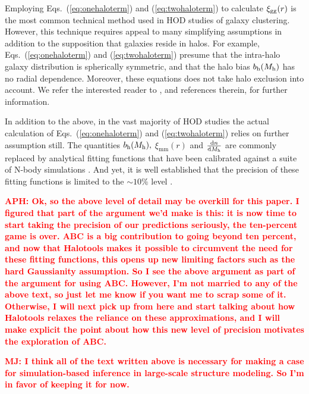 \documentclass[12pt, preprint]{aastex}
\newcommand{\todo}[1]{{\bf \textcolor{red}{ #1}}}
\begin{document}
Employing Eqs.~(\ref{eq:onehaloterm}) and (\ref{eq:twohaloterm}) to 
calculate $\xi_{\mathrm{gg}}(r)$ is the most common technical method used in HOD 
studies of galaxy clustering. 
However, this technique requires appeal to many simplifying assumptions 
in addition to the supposition that galaxies reside in halos. For example, 
Eqs.~(\ref{eq:onehaloterm}) and (\ref{eq:twohaloterm}) presume that 
the intra-halo galaxy distribution is spherically symmetric, and 
that the halo bias $b_{\mathrm{h}}(M_{\rm h})$ has no radial dependence. 
Moreover, these equations does not take halo exclusion into account. 
We refer the interested reader to \citet{cooray02,mo_vdb_white10,vdBosch13}, 
and references therein, for further information. 

In addition to the above, in the vast majority of HOD studies the actual calculation of 
Eqs.~(\ref{eq:onehaloterm}) and (\ref{eq:twohaloterm}) relies on further assumption still. 
The quantities $b_{\mathrm{h}}(M_{\rm h}),$ $\xi_{\mathrm{mm}}(r)$ and $\frac{\mathrm{d} n}{\mathrm{d}M_{\rm h}}$ 
are commonly replaced by analytical fitting functions that have been calibrated 
against a suite of N-body simulations \citep[e.g.,][]{sheth_tormen01,smith03,tinker05,tinker10}.   
And yet, it is well established that the precision of these fitting functions is 
limited to the $\sim10\%$ level \citep[e.g.][]{tinker08}. 

\todo{APH: Ok, so the above level of detail may be overkill for this paper. I figured that part of the argument we'd make is this: it is now time to start taking the precision of our predictions seriously, the ten-percent game is over. ABC is a big contribution to going beyond ten percent, and now that Halotools makes it possible to circumvent the need for these fitting functions, this opens up new limiting factors such as the hard Gaussianity assumption. So I see the above argument as part of the argument for using ABC. However, I'm not married to any of the above text, so just let me know if you want me to scrap some of it. Otherwise, I will next pick up from here and start talking about how Halotools relaxes the reliance on these approximations, and I will make explicit the point about how this new level of precision motivates the exploration of ABC.}

\todo{MJ: I think all of the text written above is necessary for making a case for simulation-based inference in large-scale structure modeling. So I'm in favor of keeping it for now.}
\end{document}
